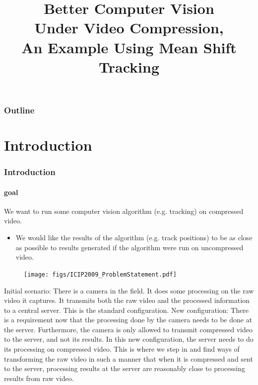 

\title{Better Computer Vision \\ Under Video Compression,\\ An Example Using Mean Shift Tracking}
\begin{frame}[plain]\logoTechTower
	\titlepage
\end{frame}

\begin{frame}\frametitle{Outline}\logoTechTower\logoCSIPCPL\mypagenum
	\tableofcontents
\end{frame}

\section{Introduction}

\begin{frame}
\frametitle{Introduction}
\framesubtitle{goal}
\logoCSIPCPL\mypagenum
{}
{
	We want to run some computer vision algorithm (e.g. tracking) on compressed video.
	\begin{itemize}
		\item We would like the results of the algorithm (e.g. track positions) to be as close as possible to results generated if the algorithm were run on uncompressed video.
	\end{itemize}
	\begin{figure}		
		\texttt{[image: figs/ICIP2009\_ProblemStatement.pdf]}
	\end{figure}
}
{
Initial scenario:  There is a camera in the field.  It does some processing on the raw video it captures.  It transmits both the raw video and the processed information to a central server.  This is the standard configuration.
\newline
\newline
New configuration: There is a requirement now that the processing done by the camera needs to be done at the server.  Furthermore, the camera is only allowed to transmit compressed video to the server, and not its results.  In this new configuration, the server needs to do its processing on compressed video.  This is where we step in and find ways of transforming the raw video in such a manner that when it is compressed and sent to the server, processing results at the server are reasonably close to processing results from raw video.
}
\end{frame}






